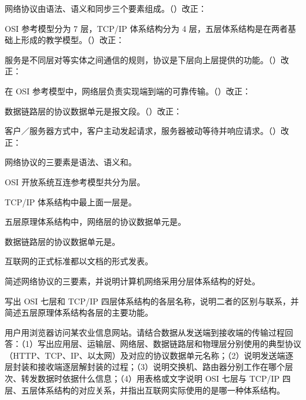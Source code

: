 \documentclass[a4paper,11pt]{article}
\begin{document}
\q 网络协议由语法、语义和同步三个要素组成。\quad（\quad）\quad 改正：\fixblank

\q OSI 参考模型分为 7 层，TCP/IP 体系结构分为 4 层，五层体系结构是在两者基础上形成的教学模型。\quad（\quad）\quad 改正：\fixblank

\q 服务是不同层对等实体之间通信的规则，协议是下层向上层提供的功能。\quad（\quad）\quad 改正：\fixblank

\q 在 OSI 参考模型中，网络层负责实现端到端的可靠传输。\quad（\quad）\quad 改正：\fixblank

\q 数据链路层的协议数据单元是报文段。\quad（\quad）\quad 改正：\fixblank

\q 客户／服务器方式中，客户主动发起请求，服务器被动等待并响应请求。\quad（\quad）\quad 改正：\fixblank

\q 网络协议的三要素是语法、语义和\fillblanks[2.0cm]。

\q OSI 开放系统互连参考模型共分为\fillblanks[1.2cm]层。

\q TCP/IP 体系结构中最上面一层是\fillblanks[2.0cm]。

\q 五层原理体系结构中，网络层的协议数据单元是\fillblanks[2.0cm]。

\q 数据链路层的协议数据单元是\fillblanks[1.6cm]。

\q 互联网的正式标准都以\fillblanks[2.0cm]文档的形式发表。

\q 简述网络协议的三要素，并说明计算机网络采用分层体系结构的好处。\anslines{2.4cm}

\q 写出 OSI 七层和 TCP/IP 四层体系结构的各层名称，说明二者的区别与联系，并简述五层原理体系结构各层的主要功能。\anslines{2.4cm}

\newpage
{}
\q 用户用浏览器访问某农业信息网站。请结合数据从发送端到接收端的传输过程回答：（1）写出应用层、运输层、网络层、数据链路层和物理层分别使用的典型协议（HTTP、TCP、IP、以太网）及对应的协议数据单元名称；（2）说明发送端逐层封装和接收端逐层解封装的过程；（3）说明交换机、路由器分别工作在哪个层次、转发数据时依据什么信息；（4）用表格或文字说明 OSI 七层与 TCP/IP 四层、五层体系结构的对应关系，并指出互联网实际使用的是哪一种体系结构。\anslines{5cm}
\end{document}
